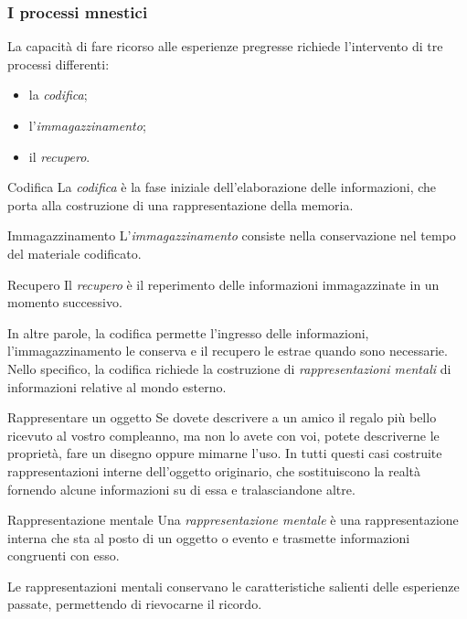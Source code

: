 \documentclass[a4paper]{article}
\begin{document}
\subsubsection{I processi mnestici}
La capacità di fare ricorso alle esperienze pregresse richiede l'intervento di tre processi differenti:
\begin{itemize}
    \item la \emph{codifica};
    \item l'\emph{immagazzinamento};
    \item il \emph{recupero}.
\end{itemize}
\begin{snippetdefinition}{Codifica}
    La \emph{codifica} è la fase iniziale dell'elaborazione delle informazioni, che porta alla costruzione di una rappresentazione della memoria.
\end{snippetdefinition}
\begin{snippetdefinition}{Immagazzinamento}
    L'\emph{immagazzinamento} consiste nella conservazione nel tempo del materiale codificato.
\end{snippetdefinition}
\begin{snippetdefinition}{Recupero}
    Il \emph{recupero} è il reperimento delle informazioni immagazzinate in un momento successivo.
\end{snippetdefinition}
In altre parole, la codifica permette l'ingresso delle informazioni, l'immagazzinamento le conserva e il recupero le estrae quando sono necessarie.
Nello specifico, la codifica richiede la costruzione di \emph{rappresentazioni mentali} di informazioni relative al mondo esterno.
\begin{snippetexample}{Rappresentare un oggetto}
    Se dovete descrivere a un amico il regalo più bello ricevuto al vostro compleanno, ma non lo avete con voi, potete descriverne le proprietà, fare un disegno oppure mimarne l'uso. In tutti questi casi costruite rappresentazioni interne dell'oggetto originario, che sostituiscono la realtà fornendo alcune informazioni su di essa e tralasciandone altre.
\end{snippetexample}
\begin{snippetdefinition}{Rappresentazione mentale}
    Una \emph{rappresentazione mentale} è una rappresentazione interna che sta al posto di un oggetto o evento e trasmette informazioni congruenti con esso.
\end{snippetdefinition}
Le rappresentazioni mentali conservano le caratteristiche salienti delle esperienze passate, permettendo di rievocarne il ricordo.
\end{document}

